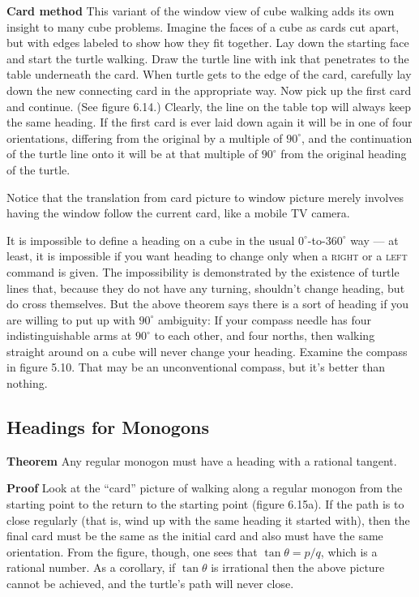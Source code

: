 \documentclass{book}
\begin{document}
\textbf{Card method} This variant of the window view of cube walking adds its
own insight to many cube problems. Imagine the faces of a cube as cards
cut apart, but with edges labeled to show how they fit together. Lay
down the starting face and start the turtle walking. Draw the turtle line
with ink that penetrates to the table underneath the card. When turtle
gets to the edge of the card, carefully lay down the new connecting card
in the appropriate way. Now pick up the first card and continue. (See
figure 6.14.) Clearly, the line on the table top will always keep the same
heading. If the first card is ever laid down again it will be in one of
four orientations, differing from the original by a multiple of $90^{\circ}$, and
the continuation of the turtle line onto it will be at that multiple of $90^{\circ}$
from the original heading of the turtle.

Notice that the translation from card picture to window picture merely
involves having the window follow the current card, like a mobile TV
camera.

It is impossible to define a heading on a cube in the usual $0^{\circ}$-to-$360^{\circ}$
way --- at least, it is impossible if you want heading to change only when
a \textsc{right} or a \textsc{left} command is given. The impossibility is demonstrated
by the existence of turtle lines that, because they do not have any
turning, shouldn't change heading, but do cross themselves. But the
above theorem says there is a sort of heading if you are willing to put up
with $90^{\circ}$ ambiguity: If your compass needle has four indistinguishable
arms at $90^{\circ}$ to each other, and four norths, then walking straight around
on a cube will never change your heading. Examine the compass in
figure 5.10. That may be an unconventional compass, but it's better
than nothing.

\subsection{Headings for Monogons}

\textbf{Theorem} Any regular monogon must have a heading with a rational
tangent.

\textbf{Proof} Look at the ``card'' picture of walking along a regular monogon
from the starting point to the return to the starting point (figure 6.15a).
If the path is to close regularly (that is, wind up with the same heading
it started with), then the final card must be the same as the initial card
and also must have the same orientation. From the figure, though, one
sees that $\tan \theta = p / q$, which is a rational number. As a corollary, if
$\tan \theta$ is irrational then the above picture cannot be achieved, and the
turtle's path will never close.
\end{document}
